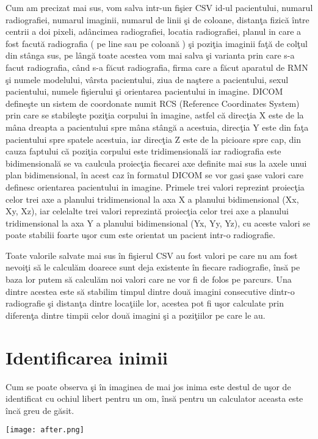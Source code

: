 Cum am precizat mai sus, vom salva intr-un fi\c{s}ier CSV id-ul pacientului, numarul radiografiei, numarul imaginii, numarul de linii \c{s}i de coloane, distan\c{t}a fizic\u{a} \^{i}ntre centrii a doi pixeli, ad\^{a}ncimea radiografiei, locatia radiografiei, planul in care a fost facut\u{a} radiografia ( pe line sau pe coloan\u{a} ) \c{s}i pozi\c{t}ia imaginii fa\c{t}\u{a} de col\c{t}ul din st\^{a}nga sus, pe l\^{a}ng\u{a} toate acestea vom mai salva \c{s}i varianta prin care s-a facut radiografia, c\^{a}nd s-a f\u{a}cut radiografia, firma care a f\u{a}cut aparatul de RMN \c{s}i numele modelului, v\^{a}rsta pacientului, ziua de na\c{s}tere a pacientului, sexul pacientului, numele fi\c{s}ierului \c{s}i orientarea pacientului in imagine. DICOM define\c{s}te un sistem de coordonate numit RCS (Reference Coordinates System) prin care se stabile\c{s}te pozi\c{t}ia corpului  \^{i}n imagine, astfel c\u{a} direc\c{t}ia X este de la m\^{a}na dreapta a pacientului spre m\^{a}na st\^{a}ng\u{a} a acestuia, direc\c{t}ia Y este din fa\c{t}a pacientului spre spatele acestuia, iar direc\c{t}ia Z este de la picioare spre cap, din cauza faptului c\u{a} pozi\c{t}ia corpului este tridimensional\u{a} iar radiografia este bidimensional\u{a} se va caulcula proiec\c{t}ia fiecarei axe definite mai sus la axele unui plan bidimensional, \^{i}n acest caz \^{i}n formatul DICOM se vor gasi \c{s}ase valori care definesc orientarea pacientului in imagine. Primele trei valori reprezint proiec\c{t}ia celor trei axe a planului tridimensional la axa X a planului bidimensional (Xx, Xy, Xz), iar celelalte trei valori reprezint\u{a} proiec\c{t}ia celor trei axe a planului tridimensional la axa Y a planului bidimensional (Yx, Yy, Yz), cu aceste valori se poate stabilii foarte u\c{s}or cum este orientat un pacient intr-o radiografie.

\par

Toate valorile salvate mai sus \^{i}n fi\c{s}ierul CSV au fost valori pe care nu am fost nevoi\c{t}i s\u{a} le calcul\u{a}m doarece sunt deja existente \^{i}n fiecare radiografie, \^{i}ns\u{a} pe baza lor putem s\u{a} calcul\u{a}m noi valori care ne vor fi de folos pe parcurs. Una dintre acestea este s\u{a} stabilim timpul dintre dou\u{a} imagini consecutive dintr-o radiografie \c{s}i distan\c{t}a dintre loca\c{t}iile lor, acestea pot fi u\c{s}or calculate prin diferen\c{t}a dintre timpii  celor dou\u{a} imagini \c{s}i a pozi\c{t}iilor pe care le au.

\section{Identificarea inimii}

Cum se poate observa \c{s}i \^{i}n imaginea de mai jos inima este destul de u\c{s}or de identificat cu ochiul libert pentru un om, \^{i}ns\u{a} pentru un calculator aceasta este \^{i}nc\u{a} greu de g\u{a}sit.

\texttt{[image: after.png]}